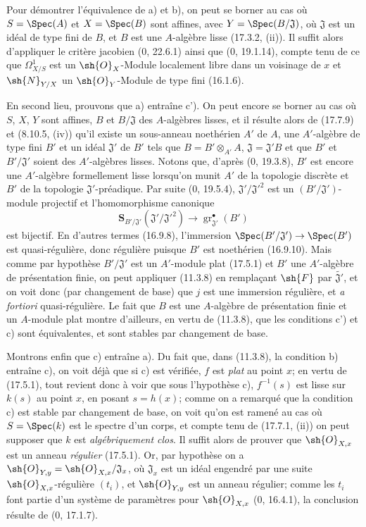 Pour démontrer l'équivalence de a) et b), on peut se borner au cas où $S=\Spec(A)$ et $X=\Spec(B)$ sont affines, avec $Y=\Spec(B/\mathfrak J)$, où $\mathfrak J$ est un idéal de type fini de $B$, et $B$ est une $A$-algèbre lisse (17.3.2, (ii)). Il suffit alors d'appliquer le critère jacobien (0, 22.6.1) ainsi que (0, 19.1.14), compte tenu de ce que $\Omega^1_{X/S}$ est un $\sh{O}_X$-Module localement libre dans un voisinage de $x$ et $\sh{N}_{Y/X}$ un $\sh{O}_Y$-Module de type fini (16.1.6).

En second lieu, prouvons que a) entraîne c'). On peut encore se borner au cas où $S$, $X$, $Y$ sont affines, $B$ et $B/\mathfrak J$ des $A$-algèbres lisses, et il résulte alors de (17.7.9) et (8.10.5, (iv)) qu'il existe un sous-anneau noethérien $A'$ de $A$, une $A'$-algèbre de type fini $B'$ et un idéal $\mathfrak J'$ de $B'$ tels que $B=B'\otimes_{A'}A$, $\mathfrak J=\mathfrak J'B$ et que $B'$ et $B'/\mathfrak J'$ soient des $A'$-algèbres lisses. Notons que, d'après (0, 19.3.8), $B'$ est encore une $A'$-algèbre formellement lisse lorsqu'on munit $A'$ de la topologie discrète et $B'$ de la topologie $\mathfrak J'$-préadique. Par suite (0, 19.5.4), $\mathfrak J'/\mathfrak J'^2$ est un $(B'/\mathfrak J')$-module projectif et l'homomorphisme canonique
\[
\mathbf{S}_{B'/\mathfrak J'}(\mathfrak J'/\mathfrak J'^2)\to\operatorname{gr}_{\mathfrak J'}^{\bullet}(B')
\]
est bijectif. En d'autres termes (16.9.8), l'immersion $\Spec(B'/\mathfrak J')\to\Spec(B')$ est quasi-régulière, donc régulière puisque $B'$ est noethérien (16.9.10). Mais comme par hypothèse $B'/\mathfrak J'$ est un $A'$-module plat (17.5.1) et $B'$ une $A'$-algèbre de présentation finie, on peut appliquer (11.3.8) en remplaçant $\sh{F}$ par $\widetilde{\mathfrak J'}$, et on voit donc (par changement de base) que $j$ est une immersion régulière, et \emph{a fortiori} quasi-régulière. Le fait que $B$ est une $A$-algèbre de présentation finie et un $A$-module plat montre d'ailleurs, en vertu de (11.3.8), que les conditions c') et c) sont équivalentes, et sont stables par changement de base.

Montrons enfin que c) entraîne a). Du fait que, dans (11.3.8), la condition b) entraîne c), on voit déjà que si c) est vérifiée, $f$ est \emph{plat} au point $x$; en vertu de (17.5.1), tout revient donc à voir que sous l'hypothèse c), $f^{-1}(s)$ est lisse sur $k(s)$ au point $x$, en posant $s=h(x)$; comme on a remarqué que la condition c) est stable par changement de base, on voit qu'on est ramené au cas où $S=\Spec(k)$ est le spectre d'un corps, et compte tenu de (17.7.1, (ii)) on peut supposer que $k$ est \emph{algébriquement clos}. Il suffit alors de prouver que $\sh{O}_{X,x}$ est un anneau \emph{régulier} (17.5.1). Or, par hypothèse on a $\sh{O}_{Y,y}=\sh{O}_{X,x}/\mathfrak J_x$, où $\mathfrak J_x$ est un idéal engendré par une suite $\sh{O}_{X,x}$-régulière $(t_i)$, et $\sh{O}_{Y,y}$ est un anneau régulier; comme les $t_i$ font partie d'un système de paramètres pour $\sh{O}_{X,x}$ (0, 16.4.1), la conclusion résulte de (0, 17.1.7).

